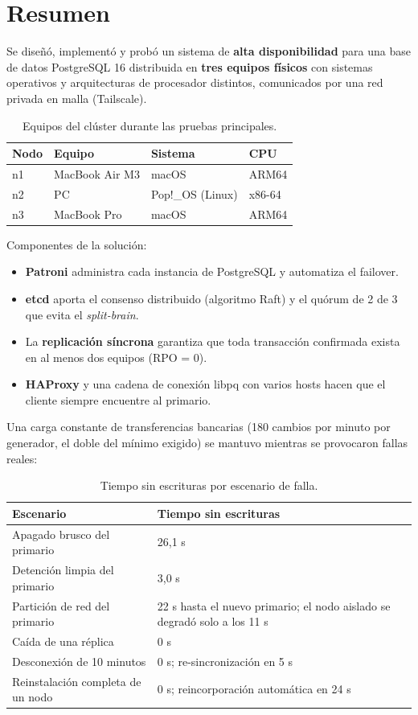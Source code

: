 \documentclass[11pt,a4paper]{article}
\begin{document}
\section*{Resumen}

Se diseñó, implementó y probó un sistema de \textbf{alta disponibilidad} para una base de datos PostgreSQL 16 distribuida en \textbf{tres equipos físicos} con sistemas operativos y arquitecturas de procesador distintos, comunicados por una red privada en malla (Tailscale).

\begin{table}[H]
\centering
\caption{Equipos del clúster durante las pruebas principales.}
\begin{tabular}{@{}llll@{}}
\toprule
\textbf{Nodo} & \textbf{Equipo} & \textbf{Sistema} & \textbf{CPU} \\
\midrule
n1 & MacBook Air M3 & macOS & ARM64 \\
n2 & PC & Pop!\_OS (Linux) & x86-64 \\
n3 & MacBook Pro & macOS & ARM64 \\
\bottomrule
\end{tabular}
\end{table}

Componentes de la solución:
\begin{itemize}
  \item \textbf{Patroni} administra cada instancia de PostgreSQL y automatiza el failover.
  \item \textbf{etcd} aporta el consenso distribuido (algoritmo Raft) y el quórum de 2 de 3 que evita el \emph{split-brain}.
  \item La \textbf{replicación síncrona} garantiza que toda transacción confirmada exista en al menos dos equipos (RPO = 0).
  \item \textbf{HAProxy} y una cadena de conexión libpq con varios hosts hacen que el cliente siempre encuentre al primario.
\end{itemize}

Una carga constante de transferencias bancarias (180 cambios por minuto por generador, el doble del mínimo exigido) se mantuvo mientras se provocaron fallas reales:

\begin{table}[H]
\centering
\caption{Tiempo sin escrituras por escenario de falla.}
\begin{tabularx}{\textwidth}{@{}lY@{}}
\toprule
\textbf{Escenario} & \textbf{Tiempo sin escrituras} \\
\midrule
Apagado brusco del primario & 26,1 s \\
Detención limpia del primario & 3,0 s \\
Partición de red del primario & 22 s hasta el nuevo primario; el nodo aislado se degradó solo a los 11 s \\
Caída de una réplica & 0 s \\
Desconexión de 10 minutos & 0 s; re-sincronización en 5 s \\
Reinstalación completa de un nodo & 0 s; reincorporación automática en 24 s \\
\bottomrule
\end{tabularx}
\end{table}
\end{document}
